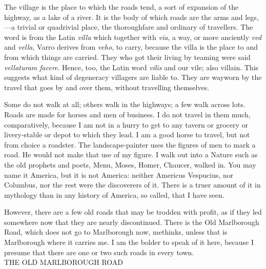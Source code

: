 \documentclass[twoside,openright,10pt]{memoir} %
\begin{document}
The village is the place to which the roads tend, a sort of expansion of the highway, as a lake of a river. It is the body of which roads are the arms and legs,—a trivial or quadrivial place, the thoroughfare and ordinary of travellers. The word is from the Latin \emph{villa} which together with \emph{via}, a way, or more anciently \emph{ved} and \emph{vella}, Varro derives from \emph{veho}, to carry, because the villa is the place to and from which things are carried. They who got their living by teaming were said \emph{vellaturam facere}. Hence, too, the Latin word \emph{vilis} and our vile; also villain. This suggests what kind of degeneracy villagers are liable to. They are wayworn by the travel that goes by and over them, without travelling themselves.

Some do not walk at all; others walk in the highways; a few walk across lots. Roads are made for horses and men of business. I do not travel in them much, comparatively, because I am not in a hurry to get to any tavern or grocery or livery-stable or depot to which they lead. I am a good horse to travel, but not from choice a roadster. The landscape-painter uses the figures of men to mark a road. He would not make that use of my figure. I walk out into a Nature such as the old prophets and poets, Menu, Moses, Homer, Chaucer, walked in. You may name it America, but it is not America: neither Americus Vespucius, nor Columbus, nor the rest were the discoverers of it. There is a truer amount of it in mythology than in any history of America, so called, that I have seen.

However, there are a few old roads that may be trodden with profit, as if they led somewhere now that they are nearly discontinued. There is the Old Marlborough Road, which does not go to Marlborough now, methinks, unless that is Marlborough where it carries me. I am the bolder to speak of it here, because I presume that there are one or two such roads in every town.\\


THE OLD MARLBOROUGH ROAD
\end{document}

